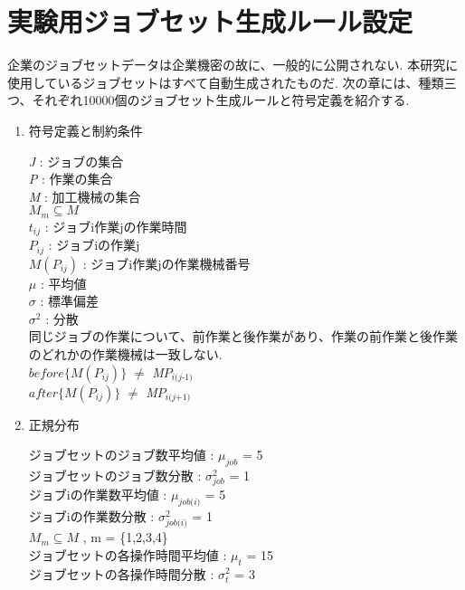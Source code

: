 \documentclass[twocolumn]{jarticle}
\begin{document}
\section{実験用ジョブセット生成ルール設定}
    企業のジョブセットデータは企業機密の故に、一般的に公開されない.
本研究に使用しているジョブセットはすべて自動生成されたものだ.
次の章には、種類三つ、それぞれ10000個のジョブセット生成ルールと符号定義を紹介する.

    \begin{enumerate}
    \item \label{item:setting} 符号定義と制約条件
    
    \textit{J} : ジョブの集合\\
    \textit{P} : 作業の集合\\
    \textit{M} : 加工機械の集合\\
    $\textit{M}_{\textit{m}} \subseteq \textit{M}$\\
    $t_{\textit{ij}}$ : ジョブi作業jの作業時間\\
    $P_{\textit{ij}}$ : ジョブiの作業j\\
    $\textit{M}(P_{\textit{ij}})$ : ジョブi作業jの作業機械番号\\
    $\mu$ : 平均値\\
    $\sigma$ : 標準偏差\\
    $\sigma^2$ : 分散\\
    
    同じジョブの作業について、前作業と後作業があり、作業の前作業と後作業のどれかの作業機械は一致しない.\\

    $before\{\textit{M}(P_{\textit{ij}})\}$ $\neq$ \textit{M}$P_{\textit{i(j-1)}}$ \\
    $after\{\textit{M}(P_{\textit{ij}})\}$ $\neq$ \textit{M}$P_{\textit{i(j+1)}}$ \\

    \item 正規分布
    
    ジョブセットのジョブ数平均値 : $\mu_{\textit{job}}$ = 5\\
    ジョブセットのジョブ数分散 : $\sigma^2_{\textit{job}}$ = 1\\
    ジョブiの作業数平均値 : $\mu_\textit{job(i)}$ = 5\\
    ジョブiの作業数分散 : $\sigma^2_\textit{job(i)}$ = 1\\
    $\textit{M}_{\textit{m}} \subseteq \textit{M}$ , m = \{1,2,3,4\}\\
    ジョブセットの各操作時間平均値 : $\mu_{\textit{t}}$ = 15\\
    ジョブセットの各操作時間分散 : $\sigma^2_{\textit{t}}$ = 3\\


\end{enumerate}
\end{document}
